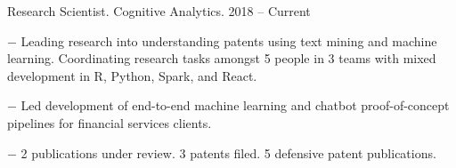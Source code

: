 \documentclass[10pt]{article}
\newcommand{\halfblankline}{\quad\vspace{-0.5\baselineskip}\pagebreak[3]}
\begin{document}
\begin{innerlist}
	\item Research Scientist. Cognitive Analytics. \hfill {2018 -- Current}
	\begin{innerlist}
    \item[$-$] Leading research into understanding patents using text mining and machine learning. Coordinating research tasks amongst 5 people in 3 teams with mixed development in R, Python, Spark, and React.
    \item[$-$] Led development of end-to-end machine learning and chatbot proof-of-concept pipelines for financial services clients.
		\item[$-$] 2 publications under review. 3 patents filed. 5 defensive patent publications.
  \end{innerlist}

  \halfblankline


\end{innerlist}
\end{document}
